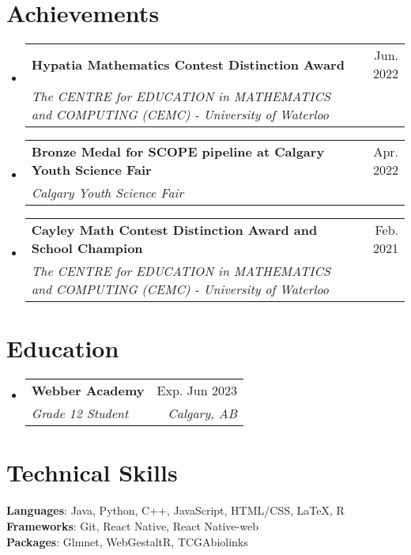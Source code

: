 \documentclass[letterpaper,11pt]{article}
\makeatletter
\newcommand{\resumeSubheading}[4]{
  \vspace{-2pt}\item
    \begin{tabular*}{0.97\textwidth}[t]{l@{\extracolsep{\fill}}r}
      \textbf{#1} & #2 \\
      \textit{\small#3} & \textit{\small #4} \\
    \end{tabular*}\vspace{-7pt}
}
\newcommand{\resumeSubHeadingListStart}{\begin{itemize}[leftmargin=0.15in, label={}]}
\newcommand{\resumeSubHeadingListEnd}{\end{itemize}}
\makeatother
\begin{document}

\section{Achievements}
    \resumeSubHeadingListStart
        \resumeSubheading
            {Hypatia Mathematics Contest Distinction Award}{Jun. 2022}
            {The CENTRE for EDUCATION in MATHEMATICS and COMPUTING (CEMC) - University of Waterloo}{}
        \resumeSubheading
            {Bronze Medal for SCOPE pipeline at Calgary Youth Science Fair}{Apr. 2022}
            {Calgary Youth Science Fair}{}
        \resumeSubheading
            {Cayley Math Contest Distinction Award and School Champion}{Feb. 2021}
            {The CENTRE for EDUCATION in MATHEMATICS and COMPUTING (CEMC) - University of Waterloo}{}     
    \resumeSubHeadingListEnd     
            
\section{Education}
  \resumeSubHeadingListStart
    \resumeSubheading
      {Webber Academy}{Exp. Jun 2023}
      {Grade 12 Student}{Calgary, AB}
        
  \resumeSubHeadingListEnd


\section{Technical Skills}
 \begin{itemize}[leftmargin=0.15in, label={}]
    \small{\item{
     \textbf{Languages}{: Java, Python, C++, JavaScript, HTML/CSS, LaTeX, R} \\
     \textbf{Frameworks}{: Git, React Native, React Native-web} \\
     \textbf{Packages}{: Glmnet, WebGestaltR, TCGAbiolinks}
    }}
 \end{itemize}


\end{document}

